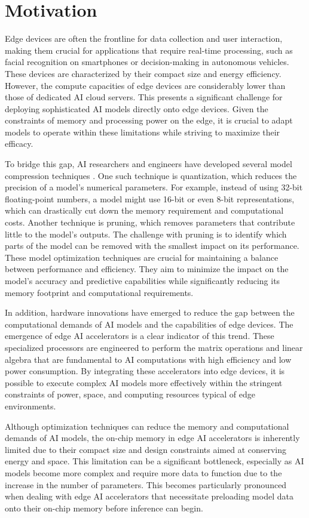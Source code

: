 \section{Motivation}
Edge devices are often the frontline for data collection and user interaction, making them crucial for applications that require real-time processing, such as facial recognition on smartphones or decision-making in autonomous vehicles.
These devices are characterized by their compact size and energy efficiency.
However, the compute capacities of edge devices are considerably lower than those of dedicated AI cloud servers.
This presents a significant challenge for deploying sophisticated AI models directly onto edge devices.
Given the constraints of memory and processing power on the edge, it is crucial to adapt models to operate within these limitations while striving to maximize their efficacy.

To bridge this gap, AI researchers and engineers have developed several model compression techniques \autocite{neillOverviewNeuralNetwork2020}.
One such technique is quantization, which reduces the precision of a model's numerical parameters.
For example, instead of using 32-bit floating-point numbers, a model might use 16-bit or even 8-bit representations, which can drastically cut down the memory requirement and computational costs.
Another technique is pruning, which removes parameters that contribute little to the model's outputs.
The challenge with pruning is to identify which parts of the model can be removed with the smallest impact on its performance.
These model optimization techniques are crucial for maintaining a balance between performance and efficiency.
They aim to minimize the impact on the model's accuracy and predictive capabilities while significantly reducing its memory footprint and computational requirements.

In addition, hardware innovations have emerged to reduce the gap between the computational demands of AI models and the capabilities of edge devices.
The emergence of edge AI accelerators is a clear indicator of this trend.
These specialized processors are engineered to perform the matrix operations and linear algebra that are fundamental to AI computations with high efficiency and low power consumption.
By integrating these accelerators into edge devices, it is possible to execute complex AI models more effectively within the stringent constraints of power, space, and computing resources typical of edge environments.

Although optimization techniques can reduce the memory and computational demands of AI models, the on-chip memory in edge AI accelerators is inherently limited due to their compact size and design constraints aimed at conserving energy and space.
This limitation can be a significant bottleneck, especially as AI models become more complex and require more data to function due to the increase in the number of parameters.
This becomes particularly pronounced when dealing with edge AI accelerators that necessitate preloading model data onto their on-chip memory before inference can begin.

